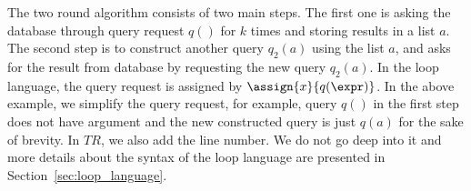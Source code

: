 The two round algorithm consists of two main steps. The first one is asking the database through query request $q()$ for $k$ times and storing results in a list $a$. The second step is to construct another query $q_2(a)$ using the list $a$, and asks for the result from database by requesting the new query $q_2(a)$. In the loop language, the query request is assigned by $ \assign{x}{q(\expr)}$. In the above example, we simplify the query request, for example, query $q()$ in the first step does not have argument and the new constructed query is just $q(a)$ for the sake of brevity. In $TR$, we also add the line number. We do not go deep into it and
 more details about the syntax of the loop language are presented in Section~\ref{sec:loop_language}. 



